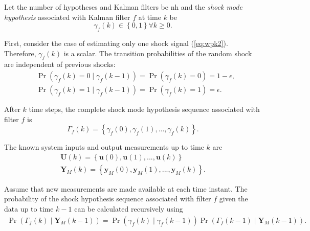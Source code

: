 Let the number of hypotheses and Kalman filters be \gls{nh} and the \textit{shock mode hypothesis} associated with Kalman filter $f$ at time $k$ be
\begin{equation} \label{eq:gammak}
	\gamma_{f}(k) \in \left\{0, 1 \right\} \forall{k \ge 0}.
\end{equation}

First, consider the case of estimating only one shock signal (\ref{eq:wpk2}). Therefore, $\gamma_f(k)$ is a scalar. The transition probabilities of the random shock are independent of previous shocks:
%
\begin{equation} \label{eq:Pr_gammak_given_gammakm1}
	\begin{aligned}
		& \Pr\left(\gamma_{f}(k)=0 \mid \gamma_{f}(k-1)\right) = \Pr\left(\gamma_{f}(k)=0\right) = 1-\epsilon, \\
		& \Pr\left(\gamma_{f}(k)=1 \mid \gamma_{f}(k-1)\right) = \Pr\left(\gamma_{f}(k)=1\right) = \epsilon.
	\end{aligned}
\end{equation}

After $k$ time steps, the complete shock mode hypothesis sequence associated with filter $f$ is
\begin{equation} \label{eq:Gammak}
	\Gamma_f(k) = \left\{ \gamma_f(0), \gamma_f(1), ..., \gamma_f(k) \right\}.
\end{equation}
%

The known system inputs and output measurements up to time $k$ are
\begin{equation} \label{eq:Uk_Yk}
	\begin{aligned}
		\mathbf{U}(k) = \left\{ \mathbf{u}(0), \mathbf{u}(1), ..., \mathbf{u}(k) \right\} \\
		\mathbf{Y}_M(k) = \left\{ \mathbf{y}_M(0), \mathbf{y}_M(1), ..., \mathbf{y}_M(k) \right\}.
	\end{aligned}
\end{equation}

Assume that new measurements are made available at each time instant. The probability of the shock hypothesis sequence associated with filter $f$ given the data up to time $k-1$ can be calculated recursively using
\begin{multline} \label{eq:Pr_Gammak_given_Ykm1}
	\Pr(\Gamma_f(k) \mid \mathbf{Y}_M(k-1)) = 
	\Pr(\gamma_f(k) \mid \gamma_f(k-1)) \Pr(\Gamma_f(k-1) \mid \mathbf{Y}_M(k-1)).
\end{multline}

